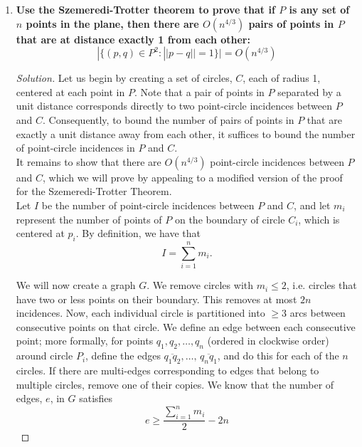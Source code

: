 \documentclass[11pt]{article}
\newenvironment{solution}
  {\renewcommand\qedsymbol{$\blacksquare$}\begin{proof}[Solution]}
  {\end{proof}}
\begin{document}
\begin{enumerate}
\begin{solution}
    Thus, by induction, we know that the above gale is a $\log_2 3$-gale $d$ satisfying the property that for all points $p$ in the right Sierpinski triangle, there is an infinite sequence $q_0 \supset q_1 \dots $ of nested dyadic squares such that $p \in \bigcap_{n \in \mathbb{N}} q_n$ and $d(q_n) = \Omega(1)$.
    \end{solution}

    \newpage
    
    \item\textbf{Use the Szemeredi-Trotter theorem to prove that if $P$ is any set of $n$ points in the plane, then there are $O(n^{4/3})$ pairs of points in $P$ that are at distance exactly 1 from each other:}
    \[|\{(p,q) \in P^2:||p-q||=1\}|=O(n^{4/3})\]

    \begin{solution} Let us begin by creating a set of circles, $C$, each of radius 1, centered at each point in $P$. Note that a pair of points in $P$ separated by a unit distance corresponds directly to two point-circle incidences between $P$ and $C$. Consequently, to bound the number of pairs of points in $P$ that are exactly a unit distance away from each other, it suffices to bound the number of point-circle incidences in $P$ and $C$. \\

    It remains to show that there are $O(n^{4/3})$ point-circle incidences between $P$ and $C$, which we will prove by appealing to a modified version of the proof for the Szemeredi-Trotter Theorem. \\

    Let $I$ be the number of point-circle incidences between $P$ and $C$, and let $m_i$ represent the number of points of $P$ on the boundary of circle $C_i$, which is centered at $p_i$. By definition, we have that \[ I = \sum\limits_{i=1}^n m_i.\]

    We will now create a graph $G$. We remove circles with $m_i \leq 2$, i.e. circles that have two or less points on their boundary. This removes at most $2n$ incidences. Now, each individual circle is partitioned into $\geq 3$ arcs between consecutive points on that circle. We define an edge between each consecutive point; more formally, for points $q_1, q_2, \dots, q_n$ (ordered in clockwise order) around circle $P_i$, define the edges $\overline{q_1q_2}, \dots, \, \overline{q_nq_1}$, and do this for each of the $n$ circles. If there are multi-edges corresponding to edges that belong to multiple circles, remove one of their copies. We know that the number of edges, $e$, in $G$ satisfies
    \[ e \geq \frac{\sum\limits_{i=1}^n m_i}{2} - 2n\]


\end{solution}
\end{enumerate}
\end{document}
